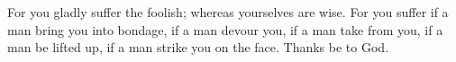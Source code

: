 For you gladly suffer the foolish; whereas yourselves are wise. For you suffer if a man bring you into bondage, if a man devour you, if a man take from you, if a man be lifted up, if a man strike you on the face. \rubric{\Rbar} Thanks be to God.